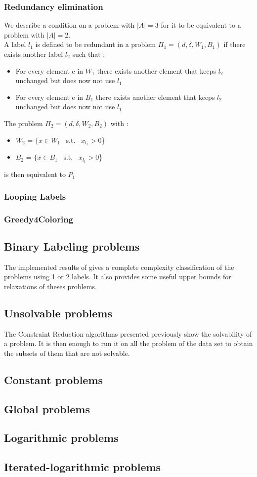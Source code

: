 \documentclass{article}
\theoremstyle{definition}
\newcommand{\wdd}[0]{d}
\newcommand{\bdd}[0]{\delta}
\begin{document}
\subsubsection{Redundancy elimination}
We describe a condition on a problem with $|A|=3$ for it to be equivalent to a problem with $|A|=2$.\\
A label $l_1$ is defined to be redundant in a problem $\Pi_1 = (\wdd,\bdd,W_1,B_1)$ if there exists another label $l_2$ such that :
\begin{itemize}
    \item For every element e in $W_1$ there exists another element that keeps $l_2$ unchanged but does now not use $l_1$
    \item For every element e in $B_1$ there exists another element that keeps $l_2$ unchanged but does now not use $l_1$
\end{itemize}
The problem $\Pi_2 = (\wdd,\bdd,W_2,B_2)$ with :
\begin{itemize}
    \item $W_2$ = $ \{x \in W_1$ \hbox{ s.t. } $x_{l_1} > 0$\}
    \item $B_2$ = $ \{x \in B_1$ \hbox{ s.t. } $x_{l_1} > 0$\}
\end{itemize}
is then equivalent to $P_1$
\subsubsection{Looping Labels}
\subsubsection{Greedy4Coloring}
\subsection{Binary Labeling problems}
The implemented results of \cite{1} gives a complete complexity classification of the problems using 1 or 2 labels. It also provides some useful upper bounds for relaxations of theses problems.
\subsection{Unsolvable problems}
The Constraint Reduction algorithms presented previously show the solvability of a problem. It is then enough to run it on all the problem of the data set to obtain the subsets of them that are not solvable.
\subsection{Constant problems}

\subsection{Global problems}
\subsection{Logarithmic problems}
\subsection{Iterated-logarithmic problems}


\end{document}
